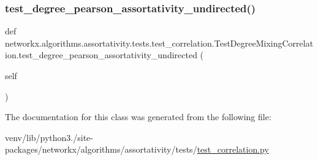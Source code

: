 \subsubsection{\texorpdfstring{test\+\_\+degree\+\_\+pearson\+\_\+assortativity\+\_\+undirected()}{test\_degree\_pearson\_assortativity\_undirected()}}
{\footnotesize\ttfamily def networkx.\+algorithms.\+assortativity.\+tests.\+test\+\_\+correlation.\+Test\+Degree\+Mixing\+Correlation.\+test\+\_\+degree\+\_\+pearson\+\_\+assortativity\+\_\+undirected (\begin{DoxyParamCaption}\item[{}]{self }\end{DoxyParamCaption})}



The documentation for this class was generated from the following file\+:\begin{DoxyCompactItemize}
\item 
venv/lib/python3./site-\/packages/networkx/algorithms/assortativity/tests/\hyperlink{test__correlation_8py}{test\+\_\+correlation.\+py}\end{DoxyCompactItemize}
